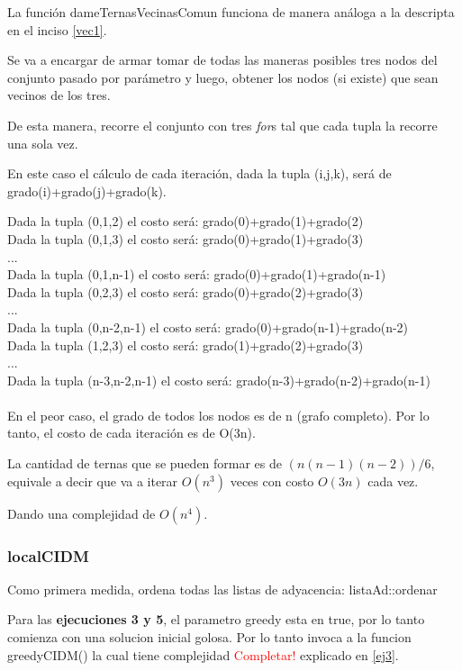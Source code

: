 La funci\'on dameTernasVecinasComun funciona de manera an\'aloga a la descripta en el inciso \ref{vec1}.

	Se va a encargar de armar tomar de todas las maneras posibles tres nodos del conjunto pasado por par\'ametro y luego, 
	obtener los nodos (si existe) que sean vecinos de los tres.

	De esta manera, recorre el conjunto con tres \emph{for}s tal que cada tupla la recorre una sola vez.

	En este caso el c\'alculo de cada iteraci\'on, dada la tupla (i,j,k), ser\'a de grado(i)+grado(j)+grado(k).

	Dada la tupla (0,1,2) el costo ser\'a: grado(0)+grado(1)+grado(2)\\
	Dada la tupla (0,1,3) el costo ser\'a: grado(0)+grado(1)+grado(3)\\
	...\\
	Dada la tupla (0,1,n-1) el costo ser\'a: grado(0)+grado(1)+grado(n-1)\\
	Dada la tupla (0,2,3) el costo ser\'a: grado(0)+grado(2)+grado(3)\\
	...\\
	Dada la tupla (0,n-2,n-1) el costo ser\'a: grado(0)+grado(n-1)+grado(n-2)\\
	Dada la tupla (1,2,3) el costo ser\'a: grado(1)+grado(2)+grado(3)\\
	...\\
	Dada la tupla (n-3,n-2,n-1) el costo ser\'a: grado(n-3)+grado(n-2)+grado(n-1)\\
	\\

	En el peor caso, el grado de todos los nodos es de n (grafo completo). Por lo tanto, el costo de cada iteraci\'on es de O(3n).

	La cantidad de ternas que se pueden formar es de $(n(n-1)(n-2))/6$, equivale a decir que va a iterar $O(n^3)$ veces con costo $O(3n)$ cada vez.

	Dando una complejidad de $O(n^4)$.
	
	

\newpage
\subsubsection{localCIDM}
Como primera medida, ordena todas las listas de adyacencia: listaAd::ordenar

Para las \textbf{ejecuciones 3 y 5}, el parametro greedy esta en true, por lo tanto comienza con una solucion inicial golosa. Por lo tanto invoca a la funcion greedyCIDM() la cual tiene complejidad \textcolor{red}{Completar!} explicado en \ref{ej3}.\\

